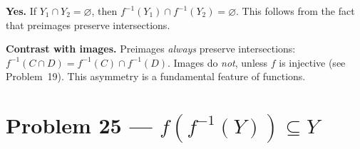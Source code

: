 \documentclass[12pt, a4paper]{article}
\begin{document}
\begin{answerbox}
\textbf{Yes.} If $Y_1 \cap Y_2 = \varnothing$, then $f^{-1}(Y_1) \cap f^{-1}(Y_2) = \varnothing$.
This follows from the fact that preimages preserve intersections.
\end{answerbox}

\bigskip
\textbf{Contrast with images.}\; Preimages \emph{always} preserve intersections: $f^{-1}(C \cap D) = f^{-1}(C) \cap f^{-1}(D)$. Images do \emph{not}, unless $f$ is injective (see Problem~19). This asymmetry is a fundamental feature of functions.

\newpage
\section{Problem 25 --- \texorpdfstring{$f(f^{-1}(Y)) \subseteq Y$}{f(f⁻¹(Y)) ⊆ Y}}
\end{document}
